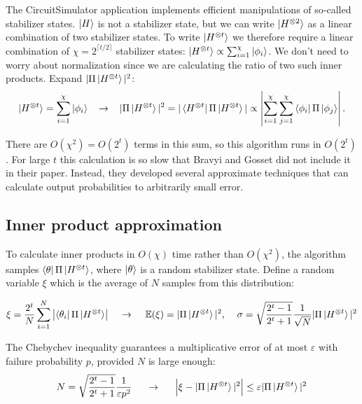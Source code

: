 \documentclass[11pt]{article}
\begin{document}
The CircuitSimulator application implements efficient manipulations of so-called stabilizer states. $\ket{H}$ is not a stabilizer state, but we can write $\ket{H^{\otimes 2}}$ as a linear combination of two stabilizer states. To write $\ket{H^{\otimes t}}$ we therefore require a linear combination of $\chi = 2^{\lceil t/2\rceil}$ stabilizer states: $\ket{H^{\otimes t}} \propto \sum_{i=1}^\chi \ket{\phi_i}$.  We don't need to worry about normalization since we are calculating the ratio of two such inner products. Expand $|\Pi\ket{H^{\otimes t}}|^2$:
$$\ket{H^{\otimes t}} = \sum^\chi_{i=1} \ket{\phi_i} \hspace{3mm} \to \hspace{3mm} |\Pi\ket{H^{\otimes t}}|^2 = |\bra{H^{\otimes t}}\Pi\ket{H^{\otimes t}}| \propto \left| \sum^\chi_{i=1} \sum^\chi_{j=1}\bra{\phi_i}\Pi\ket{\phi_j}\right|.\label{eq:decomp}$$

There are $O(\chi^2) = O(2^t)$ terms in this sum, so this algorithm runs in $O(2^t)$. For large $t$ this calculation is so slow that Bravyi and Gosset did not include it in their paper. Instead, they developed several approximate techniques that can calculate output probabilities to arbitrarily small error.


\subsection{Inner product approximation} \label{sec:ipa}

To calculate inner products in $O(\chi)$ time rather than $O(\chi^2)$, the algorithm samples $\bra{\theta}\Pi\ket{H^{\otimes t}}$, where $\ket{\theta}$ is a random stabilizer state. Define a random variable $\xi$ which is the average of $N$ samples from this distribution:

$$\xi = \frac{2^t}{N} \sum_{i=1}^N \left| \bra{\theta_i} \Pi \ket{H^{\otimes t}} \right|\hspace{4mm}\to\hspace{4mm} \mathbb{E}(\xi) = | \Pi \ket{H^{\otimes t}}|^2,\hspace{4mm} \sigma = \sqrt{\frac{2^t - 1}{2^t + 1}} \frac{1}{\sqrt{N}} | \Pi \ket{H^{\otimes t}}|^2 $$

\newcommand{\eps}{\varepsilon}
The Chebychev inequality guarantees a multiplicative error of at most $\eps$ with failure probability $p$, provided $N$ is large enough:
$$ N = \sqrt{\frac{2^t - 1}{2^t + 1}} \frac{1}{\eps p^2} \hspace{0.5cm}\to \hspace{0.5cm} \Big|\xi - |\Pi\ket{H^{\otimes t}}|^2 \Big| \leq \eps |\Pi\ket{H^{\otimes t}}|^2 $$
\end{document}
